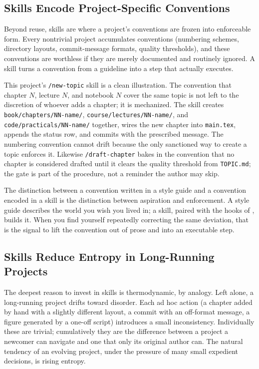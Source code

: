 \subsection{Skills Encode Project-Specific Conventions}\label{subsec:skills-encode-conventions}

Beyond reuse, skills are where a project's conventions are frozen into enforceable form. Every nontrivial project accumulates conventions (numbering schemes, directory layouts, commit-message formats, quality thresholds), and these conventions are worthless if they are merely documented and routinely ignored. A skill turns a convention from a guideline into a step that actually executes.

This project's \texttt{/new-topic} skill is a clean illustration. The convention that chapter $N$, lecture $N$, and notebook $N$ cover the same topic is not left to the discretion of whoever adds a chapter; it is mechanized. The skill creates \texttt{book/chapters/NN-name/}, \texttt{course/lectures/NN-name/}, and \texttt{code/practicals/NN-name/} together, wires the new chapter into \texttt{main.tex}, appends the status row, and commits with the prescribed message. The numbering convention cannot drift because the only sanctioned way to create a topic enforces it. Likewise \texttt{/draft-chapter} bakes in the convention that no chapter is considered drafted until it clears the quality threshold from \texttt{TOPIC.md}; the gate is part of the procedure, not a reminder the author may skip.

\begin{remark}
The distinction between a convention written in a style guide and a convention encoded in a skill is the distinction between aspiration and enforcement. A style guide describes the world you wish you lived in; a skill, paired with the hooks of , builds it. When you find yourself repeatedly correcting the same deviation, that is the signal to lift the convention out of prose and into an executable step.
\end{remark}

\subsection{Skills Reduce Entropy in Long-Running Projects}\label{subsec:skills-reduce-entropy}

The deepest reason to invest in skills is thermodynamic, by analogy. Left alone, a long-running project drifts toward disorder. Each ad hoc action (a chapter added by hand with a slightly different layout, a commit with an off-format message, a figure generated by a one-off script) introduces a small inconsistency. Individually these are trivial; cumulatively they are the difference between a project a newcomer can navigate and one that only its original author can. The natural tendency of an evolving project, under the pressure of many small expedient decisions, is rising entropy.

